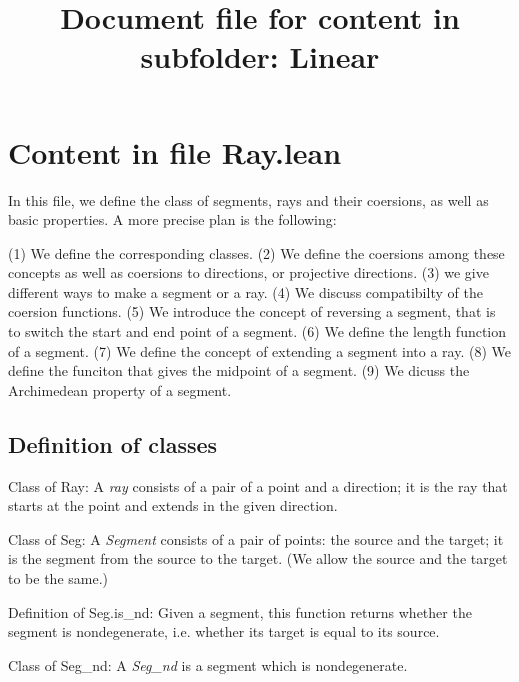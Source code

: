 \documentclass[12pt,a4paper]{article}
\title{Document file for content in subfolder: Linear}
\begin{document}
\section{Content in file Ray.lean}

In this file, we define the class of segments, rays and their coersions, as well as basic properties.  A more precise plan is the following:

(1) We define the corresponding classes. 
(2) We define the coersions among these concepts as well as coersions to directions, or projective directions.
(3) we give different ways to make a segment or a ray.
(4) We discuss compatibilty of the coersion functions.
(5) We introduce the concept of reversing a segment, that is to switch the start and end point of a segment.
(6) We define the length function of a segment.
(7) We define the concept of extending a segment into a ray.
(8) We define the funciton that gives the midpoint of a segment.
(9) We dicuss the Archimedean property of a segment.

\subsection{Definition of classes}

Class of Ray: A \emph{ray} consists of a pair of a point and a direction; it is the ray that starts at the point and extends in the given direction.

Class of Seg: A \emph{Segment} consists of a pair of points: the source and the target; it is the segment from the source to the target. (We allow the source and the target to be the same.)

Definition of Seg.is_nd: Given a segment, this function returns whether the segment is nondegenerate, i.e. whether its target is equal to its source.

Class of Seg_nd: A \emph{Seg_nd} is a segment which is nondegenerate.
\end{document}
